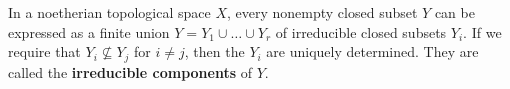 In a noetherian topological space $X$, every nonempty closed subset $Y$ can be expressed as a finite union $Y = Y_1 \cup \ldots \cup Y_r$ of irreducible closed subsets $Y_i$. If we require that $Y_i \nsubseteq Y_j$ for $i \neq j$, then the $Y_i$ are uniquely determined. They are called the \textbf{irreducible components} of $Y$.
